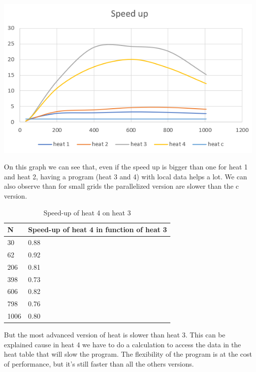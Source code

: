 \documentclass{report}
\begin{document}
\begin{center}
    \includegraphics[scale=1]{Images/speed-up_function_N.png}
    \label{fig9}
\end{center}

On this graph we can see that, even if the speed up is bigger than one for heat 1 and heat 2, having a program (heat 3 and 4) with local data helps a lot.
We can also observe than for small grids the parallelized version are slower than the c version. 

\begin{table}[h]
\centering
\caption{Speed-up of heat 4 on heat 3}
\label{tab:my-table}
\begin{tabular}{l|l}
N    & Speed-up of heat 4 in function of heat 3 \\ \hline
30   & 0.88                                     \\
62   & 0.92                                     \\
206  & 0.81                                     \\
398  & 0.73                                     \\
606  & 0.82                                     \\
798  & 0.76                                     \\
1006 & 0.80                                    
\end{tabular}
\end{table}

But the most advanced version of heat is slower than heat 3. This can be explained cause in heat 4 we have to do a calculation to access the data in the heat table that will slow the program. The flexibility of the program is at the cost of performance, but it's still faster than all the others versions.
\end{document}
